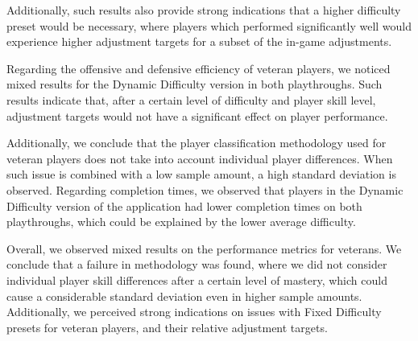 Additionally, such results also provide strong indications that a higher difficulty preset would be necessary, where players which performed significantly well would experience higher adjustment targets for a subset of the in-game adjustments.

Regarding the offensive and defensive efficiency of veteran players, we noticed mixed results for the Dynamic Difficulty version in both playthroughs. Such results indicate that, after a certain level of difficulty and player skill level, adjustment targets would not have a significant effect on player performance.

Additionally, we conclude that the player classification methodology used for veteran players does not take into account individual player differences. When such issue is combined with a low sample amount, a high standard deviation is observed. Regarding completion times, we observed that players in the Dynamic Difficulty version of the application had lower completion times on both playthroughs, which could be explained by the lower average difficulty.

Overall, we observed mixed results on the performance metrics for veterans. We conclude that a failure in methodology was found, where we did not consider individual player skill differences after a certain level of mastery, which could cause a considerable standard deviation even in higher sample amounts. Additionally, we perceived strong indications on issues with Fixed Difficulty presets for veteran players, and their relative adjustment targets.



